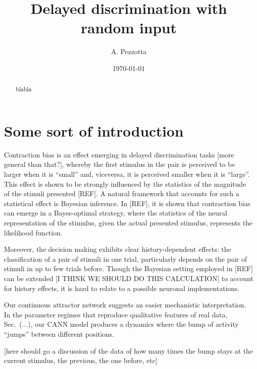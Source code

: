\documentclass[aps,pre,reprint,onecolumn,notitlepage,superscriptaddress,nofootinbib]{revtex4-2}
\begin{document}
	\title{Delayed discrimination with random input}
	\noaffiliation
	\author{A. Pezzotta} %
	
	\date{\today}
	
	\begin{abstract}
		blabla
	\end{abstract}

	\maketitle

	\section*{Some sort of introduction}

	Contraction bias is an effect emerging in delayed discrimination tasks [more general than that?], whereby the first stimulus in the pair is perceived to be larger when it is ``small'' and, viceversa, it is perceived smaller when it is ``large''.
	This effect is shown to be strongly influenced by the statistics of the magnitude of the stimuli presented [REF].
	A natural framework that accounts for such a statistical effect is Bayesian inference. In [REF], it is shown that contraction bias can emerge in a Bayes-optimal strategy, where the statistics of the neural representation of the stimulus, given the actual presented stimulus, represents the likelihood function.
	
	Moreover, the decision making exhibits clear history-dependent effects: the classification of a pair of stimuli in one trial, particularly depends on the pair of stimuli in up to few trials before.
	Though the Bayesian setting employed in [REF] can be extended {\color{red} [I THINK WE SHOULD DO THIS CALCULATION]} to account for history effects, it is hard to relate to a possible neuronal implementations.

	Our continuous attractor network suggests an easier mechanistic interpretation.
	In the parameter regimes that reproduce qualitative features of real data, Sec.~(...), our CANN model produces a dynamics where the bump of activity ``jumps'' between different positions.

	{\color{red}[here should go a discussion of the data of how many times the bump stays at the current stimulus, the previous, the one before, etc]}
\end{document}
